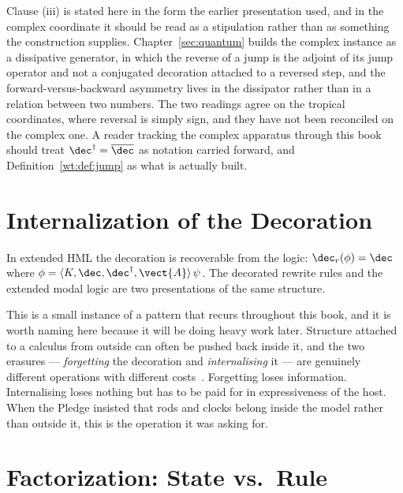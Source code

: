 \begin{remark}
\label{rmk:reversal-status}
Clause (iii) is stated here in the form the earlier presentation used, and
in the complex coordinate it should be read as a stipulation rather than
as something the construction supplies.  Chapter~\ref{sec:quantum} builds
the complex instance as a dissipative generator, in which the reverse of a
jump is the adjoint of its jump operator and not a conjugated decoration
attached to a reversed step, and the forward-versus-backward asymmetry
lives in the dissipator rather than in a relation between two numbers.
The two readings agree on the tropical coordinates, where reversal is
simply sign, and they have not been reconciled on the complex one.  A
reader tracking the complex apparatus through this book should treat
$\dec^{\dagger} = \overline{\dec}$ as notation carried forward, and
Definition~\ref{wt:def:jump} as what is actually built.
\end{remark}

\section{Internalization of the Decoration}

\begin{proposition}
In extended HML the decoration is recoverable from the logic:
$\dec_r(\phi) = \dec$ where
$\phi = \langle K, \dec, \dec^{\dagger}, \vect{A}\rangle\,\psi$.  The
decorated rewrite rules and the extended modal logic are two presentations
of the same structure.
\end{proposition}

This is a small instance of a pattern that recurs throughout this book,
and it is worth naming here because it will be doing heavy work later.
Structure attached to a calculus from outside can often be pushed back
inside it, and the two erasures --- \emph{forgetting} the decoration and
\emph{internalising} it --- are genuinely different operations with
different costs~\cite{TwoErasures}.  Forgetting loses information.
Internalising loses nothing but has to be paid for in expressiveness of
the host.  When the Pledge insisted that rods and clocks belong inside the
model rather than outside it, this is the operation it was asking for.

\section{Factorization: State vs.\ Rule}

